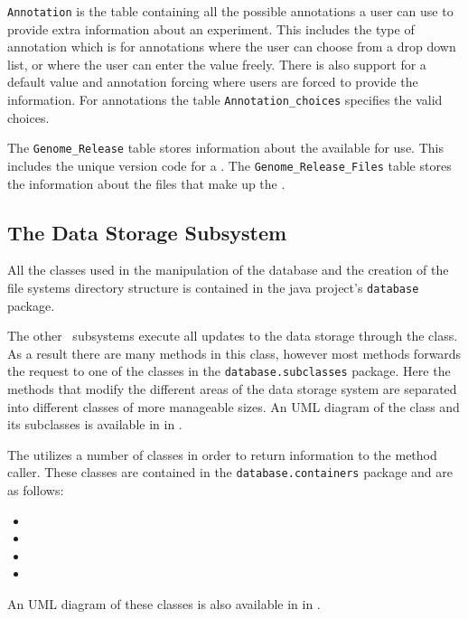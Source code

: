 \texttt{Annotation} is the table containing all the possible annotations a user can use to provide extra information about an experiment. This includes the type of annotation which is  for annotations where the user can choose from a drop down list, or  where the user can enter the value freely. There is also support for a default value and annotation forcing where users are forced to provide the information. For  annotations the table \texttt{Annotation\_choices} specifies the valid choices.

The \texttt{Genome\_Release} table stores information about the  available for use. This includes the unique version code for a \cite{UCSCGRVERSION}. The \texttt{Genome\_Release\_Files} table stores the information about the files that make up the .

\subsection{The Data Storage Subsystem}
All the classes used in the manipulation of the database and the creation of the file systems directory structure is contained in the java project's \texttt{database} package.

The other \appName\ subsystems execute all updates to the data storage through the  class. As a result there are many methods in this class, however most methods forwards the request to one of the classes in the \texttt{database.subclasses} package. Here the methods that modify the different areas of the data storage system are separated into different classes of more manageable sizes. An UML diagram of the  class and its subclasses is available in  in  .

The  utilizes a number of classes in order to return information to the method caller. These classes are contained in the \texttt{database.containers} package and are as follows:
\begin{itemize}
\item {}
\item {}
\item {}
\item {}
\end{itemize}

An UML diagram of these classes is also available in  in .

